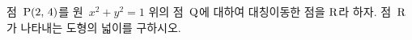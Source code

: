 점~$\mathrm{P}(2,\,4)$를 원~$x^2+y^2=1$ 위의 점~$\mathrm{Q}$에 대하여 대칭이동한 점을 $\mathrm{R}$라 하자. 점~$\mathrm{R}$가 나타내는 도형의 넓이를 구하시오.
